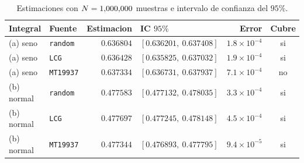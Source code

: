 \begin{table}[htbp]\centering
\caption{Estimaciones con $N=1{,}000{,}000$ muestras e intervalo de confianza del $95\%$.}
\label{tab:integrales}
\small
\begin{tabular}{l|l|r|l|r|c}
\toprule
Integral & Fuente & Estimacion & IC $95\%$ & Error & Cubre \\
\midrule
(a) seno & \texttt{random} & $0.636804$ & $[0.636201,\ 0.637408]$ & $1.8\times 10^{-4}$ & si \\
(a) seno & \texttt{LCG} & $0.636428$ & $[0.635825,\ 0.637032]$ & $1.9\times 10^{-4}$ & si \\
(a) seno & \texttt{MT19937} & $0.637334$ & $[0.636731,\ 0.637937]$ & $7.1\times 10^{-4}$ & no \\
(b) normal & \texttt{random} & $0.477583$ & $[0.477132,\ 0.478035]$ & $3.3\times 10^{-4}$ & si \\
(b) normal & \texttt{LCG} & $0.477697$ & $[0.477245,\ 0.478148]$ & $4.5\times 10^{-4}$ & si \\
(b) normal & \texttt{MT19937} & $0.477344$ & $[0.476893,\ 0.477795]$ & $9.4\times 10^{-5}$ & si \\
\bottomrule
\end{tabular}
\end{table}

